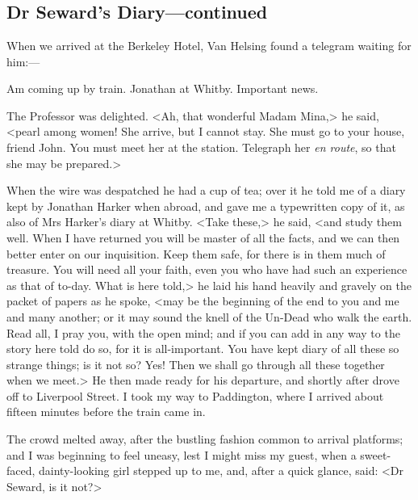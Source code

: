 \chapter[Chapter \thechapter]{}

\section{Dr Seward's Diary—continued}
	
When we arrived at the Berkeley Hotel, Van Helsing found a telegram waiting for him:—
\begin{telegram}
Am coming up by train. Jonathan at Whitby. Important news.
\end{telegram}

The Professor was delighted. <Ah, that wonderful Madam Mina,> he said, <pearl among women! She arrive, but I cannot stay. She must go to your house, friend John. You must meet her at the station. Telegraph her \textit{en route}, so that she may be prepared.>

When the wire was despatched he had a cup of tea; over it he told me of a diary kept by Jonathan Harker when abroad, and gave me a typewritten copy of it, as also of Mrs Harker's diary at Whitby. <Take these,> he said, <and study them well. When I have returned you will be master of all the facts, and we can then better enter on our inquisition. Keep them safe, for there is in them much of treasure. You will need all your faith, even you who have had such an experience as that of to-day. What is here told,> he laid his hand heavily and gravely on the packet of papers as he spoke, <may be the beginning of the end to you and me and many another; or it may sound the knell of the Un-Dead who walk the earth. Read all, I pray you, with the open mind; and if you can add in any way to the story here told do so, for it is all-important. You have kept diary of all these so strange things; is it not so? Yes! Then we shall go through all these together when we meet.> He then made ready for his departure, and shortly after drove off to Liverpool Street. I took my way to Paddington, where I arrived about fifteen minutes before the train came in.

The crowd melted away, after the bustling fashion common to arrival platforms; and I was beginning to feel uneasy, lest I might miss my guest, when a sweet-faced, dainty-looking girl stepped up to me, and, after a quick glance, said: <Dr Seward, is it not?>

